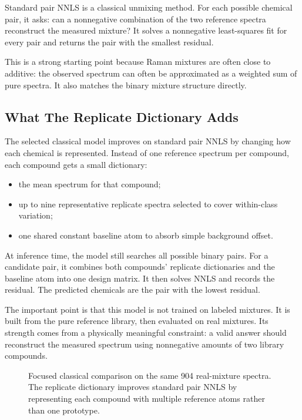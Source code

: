\documentclass[11pt]{article}
\begin{document}
Standard pair NNLS is a classical unmixing method. For each possible chemical pair, it asks: can a nonnegative combination of the two reference spectra reconstruct the measured mixture? It solves a nonnegative least-squares fit for every pair and returns the pair with the smallest residual.

This is a strong starting point because Raman mixtures are often close to additive: the observed spectrum can often be approximated as a weighted sum of pure spectra. It also matches the binary mixture structure directly.

\subsection*{What The Replicate Dictionary Adds}

The selected classical model improves on standard pair NNLS by changing how each chemical is represented. Instead of one reference spectrum per compound, each compound gets a small dictionary:

\begin{itemize}[leftmargin=*]
\item the mean spectrum for that compound;
\item up to nine representative replicate spectra selected to cover within-class variation;
\item one shared constant baseline atom to absorb simple background offset.
\end{itemize}

At inference time, the model still searches all possible binary pairs. For a candidate pair, it combines both compounds' replicate dictionaries and the baseline atom into one design matrix. It then solves NNLS and records the residual. The predicted chemicals are the pair with the lowest residual.

The important point is that this model is not trained on labeled mixtures. It is built from the pure reference library, then evaluated on real mixtures. Its strength comes from a physically meaningful constraint: a valid answer should reconstruct the measured spectrum using nonnegative amounts of two library compounds.

\begin{figure}[ht]
\centering
{}
\caption{Focused classical comparison on the same 904 real-mixture spectra. The replicate dictionary improves standard pair NNLS by representing each compound with multiple reference atoms rather than one prototype.}
\end{figure}
\end{document}
